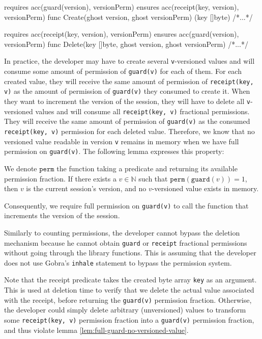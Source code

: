 \begin{gobra}
requires acc(guard(version), versionPerm)
ensures  acc(receipt(key, version), versionPerm)
func Create(ghost version, ghost versionPerm) (key []byte) {/*...*/}

requires acc(receipt(key, version), versionPerm)
ensures  acc(guard(version), versionPerm)
func Delete(key []byte, ghost version, ghost versionPerm) {/*...*/}
\end{gobra}

In practice, the developer may have to create several \texttt{v}-versioned values and will consume some amount of permission of \texttt{guard(v)} for each of them.
For each created value, they will receive the same amount of permission of \texttt{receipt(key, v)} as the amount of permission of \texttt{guard(v)} they consumed to create it.
When they want to increment the version of the session, they will have to delete all \texttt{v}-versioned values and will consume all \texttt{receipt(key, v)} fractional permissions.
They will receive the same amount of permission of \texttt{guard(v)} as the consumed \texttt{receipt(key, v)} permission for each deleted value.
Therefore, we know that no versioned value readable in version \texttt{v} remains in memory when we have full permission on \texttt{guard(v)}.
The following lemma expresses this property:

\begin{lemma}\label{lem:full-guard-no-versioned-value}
    We denote $\texttt{perm}$ the function taking a predicate and returning its available permission fraction.
    If there exists a $v \in \mathbb{N}$ such that $\texttt{perm}(\texttt{guard}(v)) = 1$, then $v$ is the current session's version, and no $v$-versioned value exists in memory.
\end{lemma}

Consequently, we require full permission on \texttt{guard(v)} to call the function that increments the version of the session.

Similarly to counting permissions, the developer cannot bypass the deletion mechanism because he cannot obtain \texttt{guard} or \texttt{receipt} fractional permissions without going through the library functions.
This is assuming that the developer does not use Gobra's \texttt{inhale} statement to bypass the permission system.

Note that the receipt predicate takes the created byte array \texttt{key} as an argument.
This is used at deletion time to verify that we delete the actual value associated with the receipt, before returning the \texttt{guard(v)} permission fraction. Otherwise, the developer could simply delete arbitrary (unversioned) values to transform some \texttt{receipt(key, v)} permission fraction into a \texttt{guard(v)} permission fraction, and thus violate lemma \ref{lem:full-guard-no-versioned-value}. %

